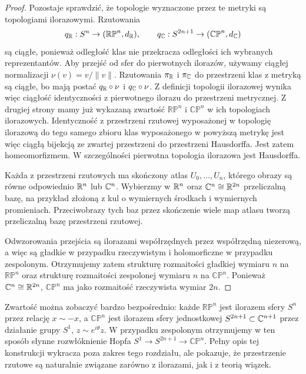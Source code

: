 \begin{proof}
Pozostaje sprawdzić, że topologie wyznaczone przez te metryki są
topologiami ilorazowymi. Rzutowania
\[
q_{\mathbb{R}}:S^n\to(\mathbb{RP}^n,d_{\mathbb{R}}),
\qquad
q_{\mathbb{C}}:S^{2n+1}\to(\mathbb{CP}^n,d_{\mathbb{C}})
\]
są ciągłe, ponieważ odległość klas nie przekracza odległości ich
wybranych reprezentantów. Aby przejść od sfer do pierwotnych ilorazów,
używamy ciągłej normalizacji $\nu(v)=v/\|v\|$.
Rzutowania $\pi_{\mathbb{R}}$ i $\pi_{\mathbb{C}}$ do przestrzeni klas z metryką są ciągłe,
bo mają postać $q_{\mathbb{R}}\circ\nu$ i $q_{\mathbb{C}}\circ\nu$.
Z definicji topologii ilorazowej wynika więc ciągłość identyczności
z pierwotnego ilorazu do przestrzeni metrycznej.
Z drugiej strony mamy już wykazaną zwartość
$\mathbb{RP}^n$ i $\mathbb{CP}^n$ w ich topologiach ilorazowych.
Identyczność z przestrzeni rzutowej wyposażonej w topologię ilorazową
do tego samego zbioru klas wyposażonego w powyższą metrykę jest więc
ciągłą bijekcją ze zwartej przestrzeni do przestrzeni Hausdorffa.
Jest zatem homeomorfizmem. W szczególności pierwotna topologia
ilorazowa jest Hausdorffa.

Każda z przestrzeni rzutowych ma skończony atlas $U_0,\ldots,U_n$,
którego obrazy są równe odpowiednio $\mathbb{R}^n$ lub $\mathbb{C}^n$. Wybierzmy
w $\mathbb{R}^n$ oraz $\mathbb{C}^n\cong\mathbb{R}^{2n}$ przeliczalną bazę, na przykład
złożoną z kul o wymiernych środkach i wymiernych promieniach.
Przeciwobrazy tych baz przez skończenie wiele map atlasu tworzą
przeliczalną bazę przestrzeni rzutowej.

Odwzorowania przejścia są ilorazami współrzędnych przez współrzędną
niezerową, a więc są gładkie w przypadku rzeczywistym i holomorficzne
w przypadku zespolonym. Otrzymujemy zatem strukturę rozmaitości
gładkiej wymiaru $n$ na $\mathbb{RP}^n$ oraz strukturę rozmaitości
zespolonej wymiaru $n$ na $\mathbb{CP}^n$. Ponieważ $\mathbb{C}^n\cong\mathbb{R}^{2n}$,
$\mathbb{CP}^n$ ma jako rozmaitość rzeczywista wymiar $2n$.
\end{proof}


\begin{uwaga}
Zwartość można zobaczyć bardzo bezpośrednio: każde $\mathbb{RP}^n$ jest ilorazem
sfery $S^n$ przez relację $x\sim-x$, a $\mathbb{CP}^n$ jest ilorazem sfery
jednostkowej $S^{2n+1}\subset\mathbb{C}^{n+1}$ przez działanie grupy $S^1$, $z\sim e^{i\theta}z$.
W przypadku zespolonym otrzymujemy w ten sposób słynne rozwłóknienie Hopfa
$S^1\longrightarrow S^{2n+1}\longrightarrow\mathbb{CP}^n$.
Pełny opis tej konstrukcji wykracza poza zakres tego rozdziału, ale pokazuje,
że przestrzenie rzutowe są naturalnie związane zarówno z ilorazami, jak i z teorią
wiązek.
\end{uwaga}

